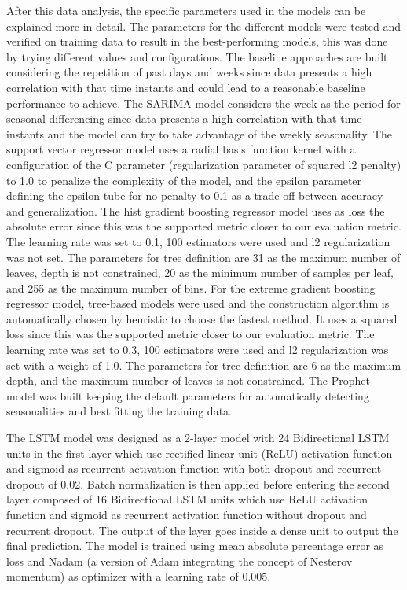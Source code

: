 After this data analysis, the specific parameters used in the models can be explained more in detail.
The parameters for the different models were tested and verified on training data to result in the best-performing models, this was done by trying different values and configurations.
The baseline approaches are built considering the repetition of past days and weeks since data presents a high correlation with that time instants and could lead to a reasonable baseline performance to achieve.
The SARIMA model considers the week as the period for seasonal differencing since data presents a high correlation with that time instants and the model can try to take advantage of the weekly seasonality.
The support vector regressor model uses a radial basis function kernel with a configuration of the C parameter (regularization parameter of squared l2 penalty) to 1.0 to penalize the complexity of the model, and the epsilon parameter defining the epsilon-tube for no penalty to 0.1 as a trade-off between accuracy and generalization.
The hist gradient boosting regressor model uses as loss the absolute error since this was the supported metric closer to our evaluation metric.
The learning rate was set to 0.1, 100 estimators were used and l2 regularization was not set.
The parameters for tree definition are 31 as the maximum number of leaves, depth is not constrained, 20 as the minimum number of samples per leaf, and 255 as the maximum number of bins.
For the extreme gradient boosting regressor model, tree-based models were used and the construction algorithm is automatically chosen by heuristic to choose the fastest method.
It uses a squared loss since this was the supported metric closer to our evaluation metric.
The learning rate was set to 0.3, 100 estimators were used and l2 regularization was set with a weight of 1.0.
The parameters for tree definition are 6 as the maximum depth, and the maximum number of leaves is not constrained.
The Prophet model was built keeping the default parameters for automatically detecting seasonalities and best fitting the training data.

The LSTM model was designed as a 2-layer model with 24 Bidirectional LSTM units in the first layer which use rectified linear unit (ReLU) activation function and sigmoid as recurrent activation function with both dropout and recurrent dropout of 0.02.
Batch normalization is then applied before entering the second layer composed of 16 Bidirectional LSTM units which use ReLU activation function and sigmoid as recurrent activation function without dropout and recurrent dropout.
The output of the layer goes inside a dense unit to output the final prediction.
The model is trained using mean absolute percentage error as loss and Nadam (a version of Adam integrating the concept of Nesterov momentum) as optimizer with a learning rate of 0.005.

